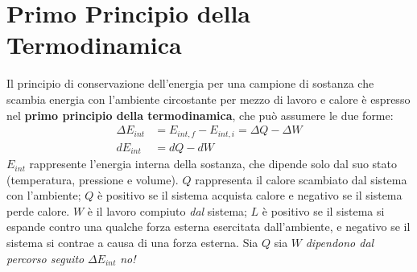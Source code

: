     \section{Primo Principio della Termodinamica} Il principio di conservazione
    dell'energia per una campione di sostanza che scambia energia con 
    l'ambiente circostante per mezzo di lavoro e calore è espresso nel \textbf{
    primo principio della termodinamica}, che può assumere le due forme:
        \begin{align}
            \Delta E_{int} &= E_{int, f} - E_{int, i} = \Delta Q - \Delta W \\
            d E_{int} &= d Q - d W
        \end{align}
    $E_{int}$ rappresente l'energia interna della sostanza, che dipende solo 
    dal suo stato (temperatura, pressione e volume). $Q$ rappresenta il calore
    scambiato dal sistema con l'ambiente; $Q$ è positivo se il sistema acquista
    calore e negativo se il sistema perde calore. $W$ è il lavoro compiuto
    \textit{dal} sistema; $L$ è positivo se il sistema si espande contro una 
    qualche forza esterna esercitata dall'ambiente, e negativo se il sistema si
    contrae a causa di una forza esterna. Sia $Q$ sia $W$ \textit{dipendono dal
    percorso seguito} $\Delta E_{int}$ \textit{no!}

